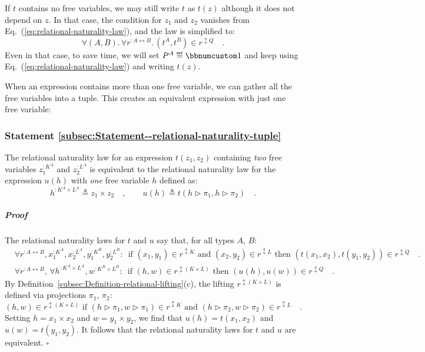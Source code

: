If $t$ contains no free variables, we may still write $t$ as $t(z)$
although it does not depend on $z$. In that case, the condition for
$z_{1}$ and $z_{2}$ vanishes from Eq.~(\ref{eq:relational-naturality-law}),
and the law is simplified to:
\begin{equation}
\forall(A,B).\,\forall r^{:A\leftrightarrow B}.\,(t^{A},t^{B})\in r^{\updownarrow Q}\quad.\label{eq:relational-naturality-law-simplified}
\end{equation}
Even in that case, to save time, we will set $P^{A}\triangleq\bbnum 1$
and keep using Eq.~(\ref{eq:relational-naturality-law}) and writing
$t(z)$.

When an expression contains more than one free variable, we can gather
all the free variables into a tuple. This creates an equivalent expression
with just one free variable:

\subsubsection{Statement \label{subsec:Statement--relational-naturality-tuple}\ref{subsec:Statement--relational-naturality-tuple} }

The relational naturality law for an expression $t(z_{1},z_{2})$
containing \emph{two} free variables $z_{1}^{:K^{A}}$ and $z_{2}^{:L^{A}}$
is equivalent to the relational naturality law for the expression
$u(h)$ with \emph{one} free variable $h$ defined as:
\[
h^{:K^{A}\times L^{A}}\triangleq z_{1}\times z_{2}\quad,\quad\quad u(h)\triangleq t(h\triangleright\pi_{1},h\triangleright\pi_{2})\quad.
\]


\subparagraph{Proof}

The relational naturality laws for $t$ and $u$ say that, for all
types $A$, $B$:
\begin{align*}
 & \forall r^{:A\leftrightarrow B},x_{1}^{:K^{A}},x_{2}^{:L^{A}},y_{1}^{:K^{B}},y_{2}^{:L^{B}}:\,\text{ if }(x_{1},y_{1})\in r^{\updownarrow K}\text{ and }(x_{2},y_{2})\in r^{\updownarrow L}\text{ then }(t(x_{1},x_{2}),t(y_{1},y_{2}))\in r^{\updownarrow Q}\quad.\\
 & \forall r^{:A\leftrightarrow B},\,\forall h^{:K^{A}\times L^{A}},w^{:K^{B}\times L^{B}}:\,\text{ if }(h,w)\in r^{\updownarrow(K\times L)}\text{ then }(u(h),u(w))\in r^{\updownarrow Q}\quad.
\end{align*}
By Definition~\ref{subsec:Definition-relational-lifting}(c), the
lifting $r^{\updownarrow(K\times L)}$ is defined via projections
$\pi_{1}$, $\pi_{2}$: 
\[
(h,w)\in r^{\updownarrow(K\times L)}\text{ if }(h\triangleright\pi_{1},w\triangleright\pi_{1})\in r^{\updownarrow K}\text{ and }(h\triangleright\pi_{2},w\triangleright\pi_{2})\in r^{\updownarrow L}\quad.
\]
Setting $h=x_{1}\times x_{2}$ and $w=y_{1}\times y_{2}$, we find
that $u(h)=t(x_{1},x_{2})$ and $u(w)=t(y_{1},y_{2})$. It follows
that the relational naturality laws for $t$ and $u$ are equivalent.
$\square$

